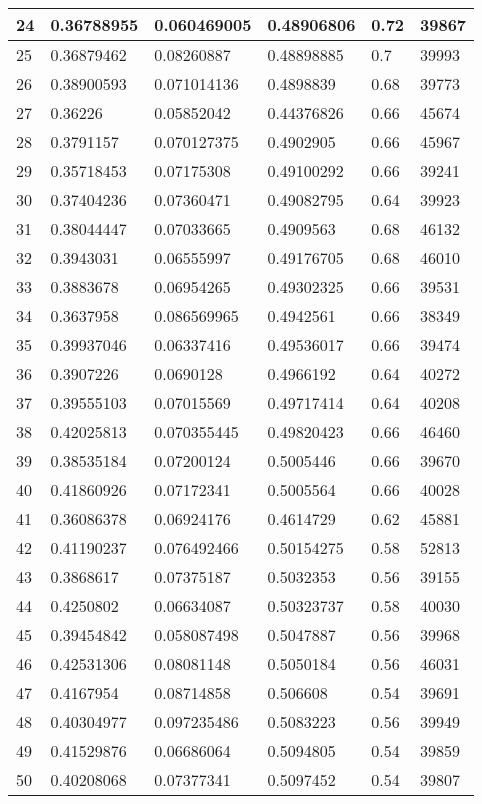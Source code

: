 \begin{longtable}{|l|l|l|l|l|l|}
24 & 0.36788955 & 0.060469005 & 0.48906806 & 0.72 & 39867 \\ \hline 
25 & 0.36879462 & 0.08260887 & 0.48898885 & 0.7 & 39993 \\ \hline 
26 & 0.38900593 & 0.071014136 & 0.4898839 & 0.68 & 39773 \\ \hline 
27 & 0.36226 & 0.05852042 & 0.44376826 & 0.66 & 45674 \\ \hline 
28 & 0.3791157 & 0.070127375 & 0.4902905 & 0.66 & 45967 \\ \hline 
29 & 0.35718453 & 0.07175308 & 0.49100292 & 0.66 & 39241 \\ \hline 
30 & 0.37404236 & 0.07360471 & 0.49082795 & 0.64 & 39923 \\ \hline 
31 & 0.38044447 & 0.07033665 & 0.4909563 & 0.68 & 46132 \\ \hline 
32 & 0.3943031 & 0.06555997 & 0.49176705 & 0.68 & 46010 \\ \hline 
33 & 0.3883678 & 0.06954265 & 0.49302325 & 0.66 & 39531 \\ \hline 
34 & 0.3637958 & 0.086569965 & 0.4942561 & 0.66 & 38349 \\ \hline 
35 & 0.39937046 & 0.06337416 & 0.49536017 & 0.66 & 39474 \\ \hline 
36 & 0.3907226 & 0.0690128 & 0.4966192 & 0.64 & 40272 \\ \hline 
37 & 0.39555103 & 0.07015569 & 0.49717414 & 0.64 & 40208 \\ \hline 
38 & 0.42025813 & 0.070355445 & 0.49820423 & 0.66 & 46460 \\ \hline 
39 & 0.38535184 & 0.07200124 & 0.5005446 & 0.66 & 39670 \\ \hline 
40 & 0.41860926 & 0.07172341 & 0.5005564 & 0.66 & 40028 \\ \hline 
41 & 0.36086378 & 0.06924176 & 0.4614729 & 0.62 & 45881 \\ \hline 
42 & 0.41190237 & 0.076492466 & 0.50154275 & 0.58 & 52813 \\ \hline 
43 & 0.3868617 & 0.07375187 & 0.5032353 & 0.56 & 39155 \\ \hline 
44 & 0.4250802 & 0.06634087 & 0.50323737 & 0.58 & 40030 \\ \hline 
45 & 0.39454842 & 0.058087498 & 0.5047887 & 0.56 & 39968 \\ \hline 
46 & 0.42531306 & 0.08081148 & 0.5050184 & 0.56 & 46031 \\ \hline 
47 & 0.4167954 & 0.08714858 & 0.506608 & 0.54 & 39691 \\ \hline 
48 & 0.40304977 & 0.097235486 & 0.5083223 & 0.56 & 39949 \\ \hline 
49 & 0.41529876 & 0.06686064 & 0.5094805 & 0.54 & 39859 \\ \hline 
50 & 0.40208068 & 0.07377341 & 0.5097452 & 0.54 & 39807 \\ \hline 
\end{longtable}